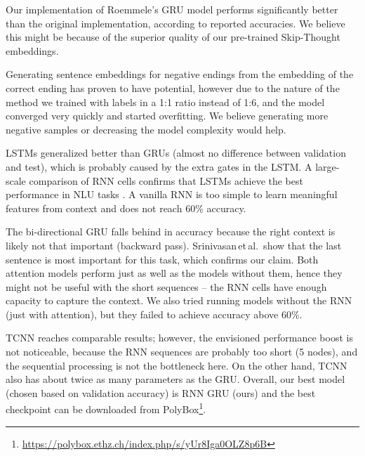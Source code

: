 \documentclass{article}
\begin{document}
Our implementation of Roemmele's GRU model performs significantly better than the original implementation,
according to reported accuracies. We believe this might be because of the superior quality of our pre-trained Skip-Thought embeddings.

Generating sentence embeddings for negative endings from the embedding of the correct ending has proven to have potential,
however due to the nature of the method we trained with labels in a 1:1 ratio instead of 1:6, and
the model converged very quickly and started overfitting. We believe generating more negative samples or decreasing the model complexity would help.

LSTMs generalized better than GRUs (almost no difference between validation and test), which is probably caused by the extra gates in the LSTM.
A large-scale comparison of RNN cells confirms that LSTMs achieve the best performance in NLU tasks \citep{JozefowiczAnArchitectures}.
A vanilla RNN is too simple to learn meaningful features from context and does not reach 60\% accuracy.

The bi-directional GRU falls behind in accuracy because the right context is likely not that important (backward pass).
Srinivasan\,et\,al.\,\citep{Srinivasan2018ATest} show that the last sentence is most important for this task, which confirms our claim.
Both attention models perform just as well as the models without them, hence they might not be useful with the short sequences -- the RNN cells have enough capacity to capture the context.
We also tried running models without the RNN (just with attention), but they failed to achieve accuracy above 60\%.

TCNN reaches comparable results; however, the envisioned performance boost is not noticeable, because the RNN sequences are probably too short (5 nodes), and the sequential processing is not the bottleneck here.
On the other hand, TCNN also has about twice as many parameters as the GRU.
Overall, our best model (chosen based on validation accuracy) is RNN GRU (ours) and the best checkpoint can be downloaded from PolyBox\footnote{\url{https://polybox.ethz.ch/index.php/s/yUr8Iga0OLZ8p6B}}.
\end{document}
